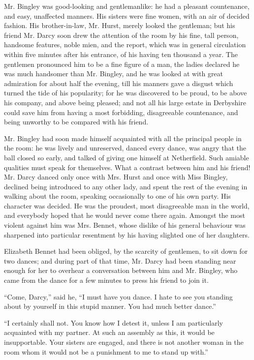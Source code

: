 \documentclass[12pt,openright]{book}
\begin{document}
Mr. Bingley was good-looking and gentlemanlike: he had a pleasant countenance, and easy, unaffected manners. His sisters were fine women, with an air of decided fashion. His brother-in-law, Mr. Hurst, merely looked the gentleman; but his friend Mr. Darcy soon drew the attention of the room by his fine, tall person, handsome features, noble mien, and the report, which was in general circulation within five minutes after his entrance, of his having ten thousand a year. The gentlemen pronounced him to be a fine figure of a man, the ladies declared he was much handsomer than Mr. Bingley, and he was looked at with great admiration for about half the evening, till his manners gave a disgust which turned the tide of his popularity; for he was discovered to be proud, to be above his company, and above being pleased; and not all his large estate in Derbyshire could save him from having a most forbidding, disagreeable countenance, and being unworthy to be compared with his friend.

Mr. Bingley had soon made himself acquainted with all the principal people in the room: he was lively and unreserved, danced every dance, was angry that the ball closed so early, and talked of giving one himself at Netherfield. Such amiable qualities must speak for themselves. What a contrast between him and his friend! Mr. Darcy danced only once with Mrs. Hurst and once with Miss Bingley, declined being introduced to any other lady, and spent the rest of the evening in walking about the room, speaking occasionally to one of his own party. His character was decided. He was the proudest, most disagreeable man in the world, and everybody hoped that he would never come there again. Amongst the most violent against him was Mrs. Bennet, whose dislike of his general behaviour was sharpened into particular resentment by his having slighted one of her daughters.

Elizabeth Bennet had been obliged, by the scarcity of gentlemen, to sit down for two dances; and during part of that time, Mr. Darcy had been standing near enough for her to overhear a conversation between him and Mr. Bingley, who came from the dance for a few minutes to press his friend to join it.

“Come, Darcy,” said he, “I must have you dance. I hate to see you standing about by yourself in this stupid manner. You had much better dance.”

“I certainly shall not. You know how I detest it, unless I am particularly acquainted with my partner. At such an assembly as this, it would be insupportable. Your sisters are engaged, and there is not another woman in the room whom it would not be a punishment to me to stand up with.”
\end{document}
